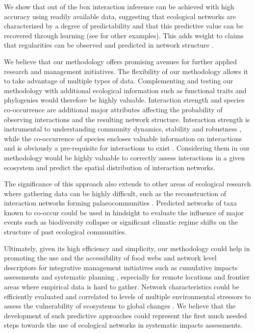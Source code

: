We show that out of the box interaction inference can be achieved with high accuracy using readily available data, suggesting that ecological networks are characterized by a degree of predictability and that this predictive value can be recovered through learning (see \cite{tamaddoni-nezhad2013, gray2015} for other examples). This adds weight to claims that regularities can be observed and predicted in network structure \citep{eklof2016}.

We believe that our methodology offers promising avenues for further applied research and management initiatives. The flexibility of our methodology allows it to take advantage of multiple types of data. Complementing and testing our methodology with additional ecological information such as functional traits and phylogenies would therefore be highly valuable. Interaction strength and species co-occurrence are additional major attributes affecting the probability of observing interactions and the resulting network structure. Interaction strength is instrumental to understanding community dynamics, stability and robustness \citep{laska1998, morales-castilla2015}, while the co-occurrence of species encloses valuable information on interactions and is obviously a pre-requisite for interactions to exist \citep{cazelles2016}. Considering them in our methodology would be highly valuable to correctly assess interactions in a given ecosystem and predict the spatial distribution of interaction networks.

The significance of this approach also extends to other areas of ecological research where gathering data can be highly difficult, such as the reconstruction of interaction networks forming palaeocommunities \citep[e.g.][]{yeakel2013, yeakel2014}. Predicted networks of taxa known to co-occur could be used in hindsight to evaluate the influence of major events such as biodiversity collapse or significant climatic regime shifts on the structure of past ecological communities.

Ultimately, given its high efficiency and simplicity, our methodology could help in promoting the use and the accessibility of food webs and network level descriptors for integrative management initiatives such as cumulative impacts assessments and systematic planning \citep{giakoumi2015, beauchesne2016}, especially for remote locations and frontier areas where empirical data is hard to gather. Network characteristics could be efficiently evaluated and correlated to levels of multiple environmental stressors to assess the vulnerability of ecosystems to global changes \citep{albouy2014}. We believe that the development of such predictive approaches could represent the first much needed steps towards the use of ecological networks in systematic impacts assessments.

